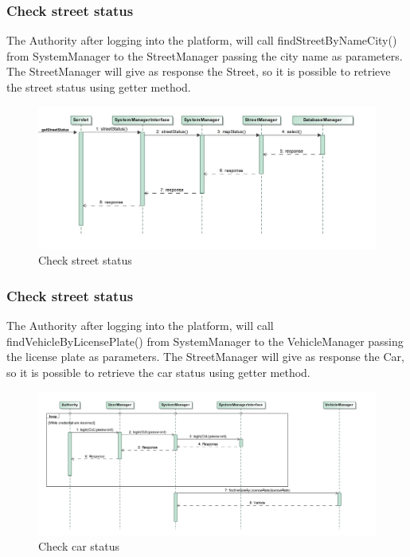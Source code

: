 \subsubsection{Check street status}
The Authority after logging into the platform, will call findStreetByNameCity() from SystemManager to the StreetManager passing the city name as parameters. The StreetManager will give as response the Street, so it is possible to retrieve the street status using getter method.
\begin{figure}
	\centering
	\includegraphics[width=0.95\linewidth, height=0.35\textheight]{Images/RunTimeDiagram/Sequence5}
	\caption{Check street status}
	\label{fig:Check street status}
\end{figure}
\subsubsection{Check street status}
The Authority after logging into the platform, will call findVehicleByLicensePlate() from SystemManager to the VehicleManager passing the license plate as parameters. The StreetManager will give as response the Car, so it is possible to retrieve the car status using getter method.
\begin{figure}
	\centering
	\includegraphics[width=0.95\linewidth, height=0.35\textheight]{Images/RunTimeDiagram/Sequence6}
	\caption{Check car status}
	\label{fig:Check car status}
\end{figure}



